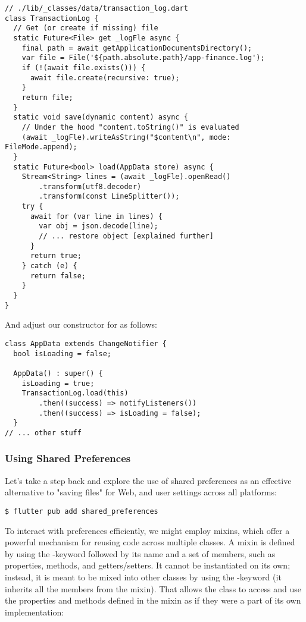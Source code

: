 \begin{lstlisting}
// ./lib/_classes/data/transaction_log.dart
class TransactionLog {
  // Get (or create if missing) file
  static Future<File> get _logFle async {
    final path = await getApplicationDocumentsDirectory();
    var file = File('${path.absolute.path}/app-finance.log');
    if (!(await file.exists())) {
      await file.create(recursive: true);
    }
    return file;
  }
  static void save(dynamic content) async {
    // Under the hood "content.toString()" is evaluated
    (await _logFle).writeAsString("$content\n", mode: FileMode.append);
  }
  static Future<bool> load(AppData store) async {
    Stream<String> lines = (await _logFle).openRead()
        .transform(utf8.decoder)
        .transform(const LineSplitter());
    try {
      await for (var line in lines) {
        var obj = json.decode(line);
        // ... restore object [explained further]
      }
      return true;
    } catch (e) {
      return false;
    }
  }
}
\end{lstlisting}

\noindent And adjust our constructor for  as follows:

\begin{lstlisting}
class AppData extends ChangeNotifier {
  bool isLoading = false;

  AppData() : super() {
    isLoading = true;
    TransactionLog.load(this)
        .then((success) => notifyListeners())
        .then((success) => isLoading = false);
  }
// ... other stuff
\end{lstlisting}


\subsubsection{Using Shared Preferences}

Let's take a step back and explore the use of shared preferences as an effective alternative to "saving files" for Web,
and user settings across all platforms:

\begin{lstlisting}[language=terminal]
$ flutter pub add shared_preferences
\end{lstlisting}

\noindent To interact with preferences efficiently, we might employ mixins, which offer a powerful mechanism for reusing 
code across multiple classes. A mixin is defined by using the -keyword followed by its name and a set of members, 
such as properties, methods, and getters/setters. It cannot be instantiated on its own; instead, it is meant to be mixed 
into other classes by using the -keyword (it inherits all the members from the mixin). That allows the class 
to access and use the properties and methods defined in the mixin as if they were a part of its own implementation:

